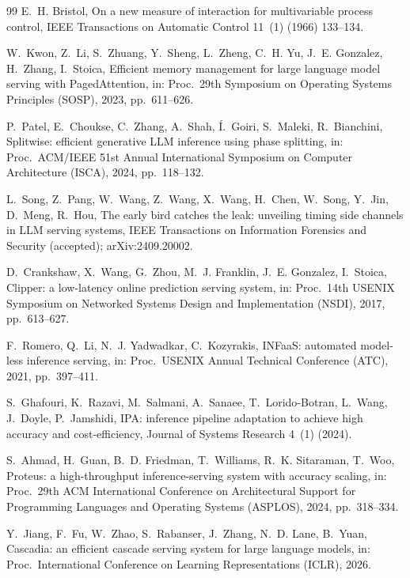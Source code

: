 \documentclass[preprint,12pt]{elsarticle}
\begin{document}
\begin{thebibliography}{99}
E.~H. Bristol, On a new measure of interaction for multivariable process
control, IEEE Transactions on Automatic Control 11~(1) (1966) 133--134.

W.~Kwon, Z.~Li, S.~Zhuang, Y.~Sheng, L.~Zheng, C.~H. Yu, J.~E. Gonzalez,
H.~Zhang, I.~Stoica, Efficient memory management for large language model
serving with PagedAttention, in: Proc.\ 29th Symposium on Operating
Systems Principles (SOSP), 2023, pp.~611--626.

P.~Patel, E.~Choukse, C.~Zhang, A.~Shah, \'I.~Goiri, S.~Maleki,
R.~Bianchini, Splitwise: efficient generative LLM inference using phase
splitting, in: Proc.\ ACM/IEEE 51st Annual International Symposium on
Computer Architecture (ISCA), 2024, pp.~118--132.

L.~Song, Z.~Pang, W.~Wang, Z.~Wang, X.~Wang, H.~Chen, W.~Song, Y.~Jin,
D.~Meng, R.~Hou, The early bird catches the leak: unveiling timing side
channels in LLM serving systems, IEEE Transactions on Information Forensics
and Security (accepted); arXiv:2409.20002.

D.~Crankshaw, X.~Wang, G.~Zhou, M.~J. Franklin, J.~E. Gonzalez, I.~Stoica,
Clipper: a low-latency online prediction serving system, in: Proc.\ 14th
USENIX Symposium on Networked Systems Design and Implementation (NSDI),
2017, pp.~613--627.

F.~Romero, Q.~Li, N.~J. Yadwadkar, C.~Kozyrakis, INFaaS: automated
model-less inference serving, in: Proc.\ USENIX Annual Technical
Conference (ATC), 2021, pp.~397--411.

S.~Ghafouri, K.~Razavi, M.~Salmani, A.~Sanaee, T.~Lorido-Botran, L.~Wang,
J.~Doyle, P.~Jamshidi, IPA: inference pipeline adaptation to achieve high
accuracy and cost-efficiency, Journal of Systems Research 4~(1) (2024).

S.~Ahmad, H.~Guan, B.~D. Friedman, T.~Williams, R.~K. Sitaraman, T.~Woo,
Proteus: a high-throughput inference-serving system with accuracy scaling,
in: Proc.\ 29th ACM International Conference on Architectural Support for
Programming Languages and Operating Systems (ASPLOS), 2024, pp.~318--334.

Y.~Jiang, F.~Fu, W.~Zhao, S.~Rabanser, J.~Zhang, N.~D. Lane, B.~Yuan,
Cascadia: an efficient cascade serving system for large language models,
in: Proc.\ International Conference on Learning Representations (ICLR),
2026.


\end{thebibliography}
\end{document}
